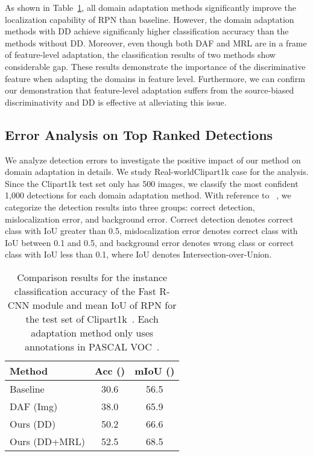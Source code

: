 \documentclass[10pt,twocolumn,letterpaper]{article}
\begin{document}
As shown in Table~\ref{tab:AccmIoU}, all domain adaptation methods significantly improve the localization capability of RPN than baseline.
However, the domain adaptation methods with DD achieve significanly higher classification accuracy than the methods without DD. 
Moreover, even though both DAF and MRL are in a frame of feature-level adaptation, the classification results of two methods show considerable gap.
These results demonstrate the importance of the discriminative feature when adapting the domains in feature level.
Furthermore, we can confirm our demonstration that feature-level adaptation suffers from the source-biased discriminativity and DD is effective at alleviating this issue.  


\subsection{Error Analysis on Top Ranked Detections} \label{sec:ErrAn}

We analyze detection errors to investigate the positive impact of our method on domain adaptation in details.
We study Real-worldClipart1k case for the analysis.
Since the Clipart1k test set only has 500 images, we classify the most confident 1,000 detections for each domain adaptation method.
With reference to ~\cite{ErrorAnalysis}, we categorize the detection results into three groups: correct detection, mislocalization error, and background error. Correct detection denotes correct class with IoU greater than 0.5, mislocalization error denotes correct class with IoU between 0.1 and 0.5, and background error denotes wrong class or correct class with IoU less than 0.1, where IoU denotes Intersection-over-Union.

\begin{table}
\small
\begin{center}
\begin{tabular}{|l|c|c|}
\hline
Method & Acc () & mIoU ()    \\ \hline \hline
Baseline  & 30.6 & 56.5  \\ \hline
DAF (Img)  & 38.0  & 65.9   \\ \hline
Ours (DD) & 50.2 & 66.6 \\ \hline
Ours (DD+MRL) & 52.5  &68.5  \\ \hline
\end{tabular}
\end{center}
\caption{Comparison results for the instance classification accuracy of the Fast R-CNN module and mean IoU of RPN for the test set of Clipart1k~\cite{Inoue_2018_CVPR}. Each adaptation method only uses annotations in PASCAL VOC~\cite{PascalVoc}.}
\label{tab:AccmIoU}
\end{table}
\end{document}
